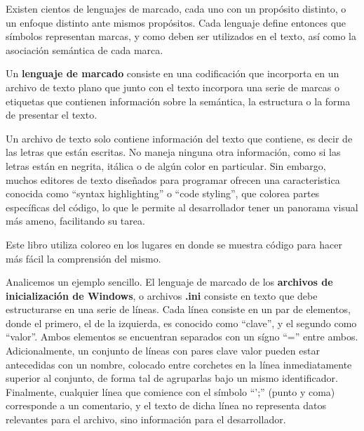 Existen cientos de lenguajes de marcado, cada uno con un propósito distinto, o
un enfoque distinto ante mismos propósitos. Cada lenguaje define entonces que
símbolos representan marcas, y como deben ser utilizados en el texto, así como
la asociación semántica de cada marca.\autocite{coombs_1987}

\begin{definition}
    Un \textbf{lenguaje de marcado} consiste en una codificación que incorporta
    en un archivo de texto plano que junto con el texto incorpora una serie de
    marcas o etiquetas que contienen información sobre la semántica, la
    estructura o la forma de presentar el texto.
\end{definition}

\begin{knowwhat}
    Un archivo de texto solo contiene información del texto que contiene, es decir
    de las letras que están escritas. No maneja ninguna otra información, como
    si las letras están en negrita, itálica o de algún color en particular.
    Sin embargo, muchos editores de texto diseñados para programar ofrecen una
    caracteristica conocida como ``syntax highlighting'' o ``code styling'', que
    colorea partes específicas del código, lo que le permite al desarrollador
    tener un panorama visual más ameno, facilitando su tarea.

    Este libro utiliza coloreo en los lugares en donde se muestra
    código para hacer más fácil la comprensión del mismo.
\end{knowwhat}

Analicemos un ejemplo sencillo. El lenguaje de marcado de los \textbf{archivos
de inicialización de Windows}, o archivos \textbf{.ini} consiste en texto que
debe estructurarse en una serie de líneas. Cada línea consiste en un par de
elementos, donde el primero, el de la izquierda, es conocido como ``clave'',
y el segundo como ``valor''. Ambos elementos se encuentran separados con un
sígno ``='' entre ambos. Adicionalmente, un conjunto de líneas con pares clave
valor pueden estar antecedidas con un nombre, colocado entre corchetes en la
línea inmediatamente superior al conjunto, de forma tal de agruparlas bajo
un mismo identificador. Finalmente, cualquier línea que comience con el símbolo 
``';'' (punto y coma) corresponde a un comentario, y el texto de dicha línea no
representa datos relevantes para el archivo, sino información para el desarrollador.
\autocite{getPrivateProfileString_2018}

